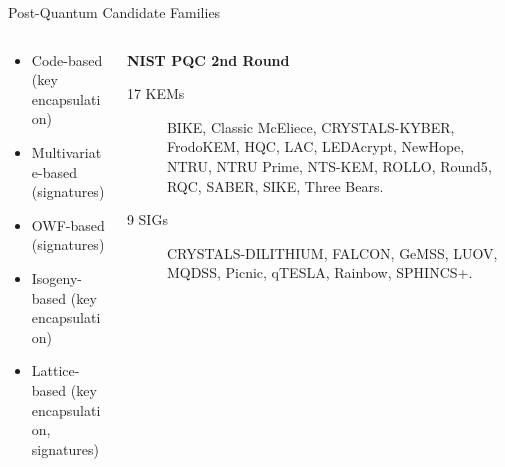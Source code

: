 \documentclass[xcolor=table,10pt,aspectratio=169]{beamer}
\begin{document}
\begin{frame}[label={sec:orgeb2768b}]{Post-Quantum Candidate Families}
\begin{columns}[t]
\begin{column}{0.4\columnwidth}
\begin{itemize}
\item \alert<1>{Code-based (key encapsulation)}
\item \alert<2>{Multivariate-based (signatures)}
\item \alert<3>{OWF-based (signatures)}
\item \alert<4>{Isogeny-based (key encapsulation)}
\item \alert<5-7>{Lattice-based} (\alert<5,7>{key encapsulation}, \alert<6,7>{signatures})
\end{itemize}
\end{column}

\begin{column}{0.6\columnwidth}
\textbf{NIST PQC 2nd Round}

\begin{description}
\item[{17 KEMs}] \alert<1>{BIKE}, \alert<1>{Classic McEliece}, \alert<5,7>{CRYSTALS-KYBER}, \alert<5,7>{FrodoKEM}, \alert<1>{HQC}, \alert<5,7>{LAC}, \alert<1>{LEDAcrypt}, \alert<5,7>{NewHope}, \alert<5,7>{NTRU}, \alert<5,7>{NTRU Prime}, \alert<1>{NTS-KEM}, \alert<1>{ROLLO}, \alert<5,7>{Round5}, \alert<1>{RQC}, \alert<5,7>{SABER}, \alert<4>{SIKE}, \alert<5,7>{Three Bears}.

\item[{9 SIGs}] \alert<6,7>{CRYSTALS-DILITHIUM}, \alert<6,7>{FALCON}, \alert<2>{GeMSS}, \alert<2>{LUOV}, \alert<2>{MQDSS}, \alert<3>{Picnic}, \alert<6,7>{qTESLA}, \alert<2>{Rainbow}, \alert<3>{SPHINCS+}.
\end{description}
\end{column}
\end{columns}
\end{frame}
\end{document}
